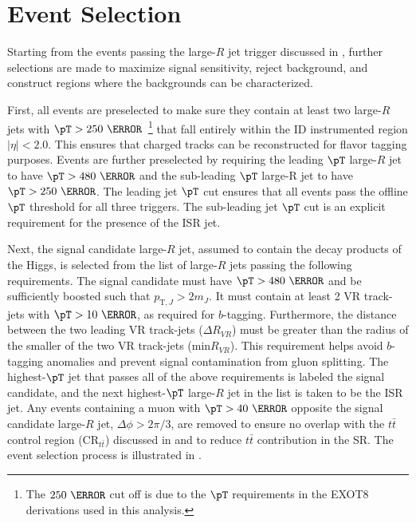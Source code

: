 \section{Event Selection} \label{sec:selection:event_selection}

Starting from the events passing the large-$R$ jet trigger discussed in
, further selections are made to maximize signal
sensitivity, reject background, and construct regions where the backgrounds
can be characterized.  

First, all events are preselected to make sure they contain at least two
large-$R$ jets with $\pT > 250~\GeV$~\footnote{The $250~\GeV$ cut off is due to
the $\pT$ requirements in the EXOT8 derivations used in this analysis.} that
fall entirely within the ID instrumented region $|\eta| < 2.0$. This ensures
that charged tracks can be reconstructed for flavor tagging purposes.  Events
are further preselected by requiring the leading $\pT$ large-$R$ jet to have
$\pT > 480~\GeV$ and the sub-leading $\pT$ large-R jet to have $\pT >
250~\GeV$. The leading jet $\pT$ cut ensures that all events pass the offline
$\pT$ threshold for all three triggers.  The sub-leading jet $\pT$ cut is an
explicit requirement for the presence of the ISR jet. 

Next, the signal candidate large-$R$ jet, assumed to contain the decay products
of the Higgs, is selected from the list of large-$R$ jets passing the following
requirements.  The signal candidate must have $\pT > 480~\GeV$ and be
sufficiently boosted such that $p_{\text{T},J} > 2m_{J}$.  It must contain at
least 2 VR track-jets with $\pT > 10~\GeV$, as required for $b$-tagging.
Furthermore, the distance between the two leading VR track-jets ($\Delta
R_{VR}$) must be greater than the radius of the smaller of the two VR
track-jets (min$R_{VR}$).  This requirement helps avoid $b$-tagging anomalies
and prevent signal contamination from gluon splitting.  The highest-$\pT$ jet
that passes all of the above requirements is labeled the signal candidate, and
the next highest-$\pT$ large-$R$ jet in the list is taken to be the ISR jet.
Any events containing a muon with $\pT > 40~\GeV$ opposite the signal candidate
large-$R$ jet, $\Delta \phi > 2\pi/3$, are removed to ensure no overlap with
the $t\bar{t}$ control region ($\text{CR}_{t\bar{t}}$) discussed in
 and to reduce $t\bar{t}$ contribution in the SR.
The event selection process is illustrated in .

